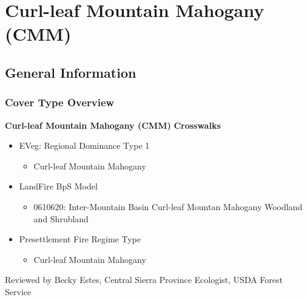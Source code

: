 \newpage
\section{Curl-leaf Mountain Mahogany (CMM)}
\label{cmm-description}

\subsection*{General Information}

\subsubsection{Cover Type Overview}

\textbf{Curl-leaf Mountain Mahogany (CMM)}
\newline
\textbf{Crosswalks}
\begin{itemize}
	\item EVeg: Regional Dominance Type 1
	\begin{itemize}
		\item Curl-leaf Mountain Mahogany
	\end{itemize}

	\item LandFire BpS Model
	\begin{itemize}
		\item 0610620: Inter-Mountain Basin Curl-leaf Mountan Mahogany Woodland and Shrubland
	\end{itemize}

	\item Presettlement Fire Regime Type
	\begin{itemize}
		\item Curl-leaf Mountain Mahogany
	\end{itemize}
\end{itemize}

\noindent Reviewed by Becky Estes, Central Sierra Province Ecologist, USDA Forest Service

